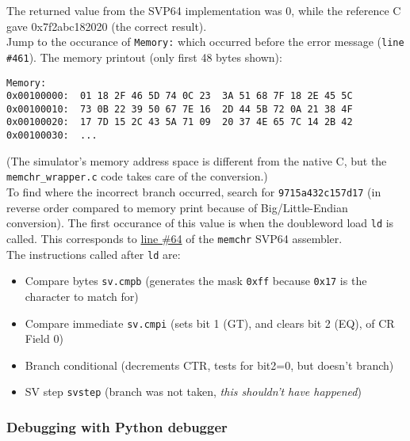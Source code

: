 The returned value from the \acrshort{SVP64} implementation was 0, while the reference C
gave 0x7f2abc182020 (the correct result).\\

Jump to the occurance of \texttt{Memory:} which occurred before the error
message (\texttt{line \#461}). The memory printout (only first 48 bytes shown):
\begin{verbatim}
Memory:
0x00100000:  01 18 2F 46 5D 74 0C 23  3A 51 68 7F 18 2E 45 5C
0x00100010:  73 0B 22 39 50 67 7E 16  2D 44 5B 72 0A 21 38 4F
0x00100020:  17 7D 15 2C 43 5A 71 09  20 37 4E 65 7C 14 2B 42
0x00100030:  ...
\end{verbatim}

(The simulator's memory address space is different from the native C,
but the \texttt{memchr\_wrapper.c} code takes care of the conversion.)\\

To find where the incorrect branch occurred, search for
\texttt{9715a432c157d17} (in reverse order compared to memory print because of
Big/Little-Endian conversion). The first occurance of this value is when
the doubleword load \texttt{ld} is called. This corresponds to
\href{https://git.vantosh.com/ngisearch/glibc-svp64/src/commit/1afb94889b8ea2f85844e410f87e5a9b8e2e959f/svp64-port/svp64/memchr_svp64.s#L64}{line \#64}
of the \texttt{memchr} SVP64 assembler.\\

The instructions called after \texttt{ld} are:

\begin{itemize}
  \item Compare bytes \texttt{sv.cmpb} (generates the mask \texttt{0xff}
        because \texttt{0x17} is the character to match for)
  \item Compare immediate \texttt{sv.cmpi} (sets bit 1 (GT), and clears
        bit 2 (EQ), of \acrshort{CR} Field 0)
  \item Branch conditional (decrements \acrshort{CTR}, tests for bit2=0, but
        doesn't branch)
  \item \acrshort{SV} step \texttt{svstep} (branch was not taken,
        \textit{this shouldn't have happened})
\end{itemize}

\subsubsection{Debugging with Python debugger}

